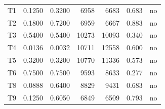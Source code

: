 \begin{table}[!htbp]
\begin{tabular}{lrrrrrl}
T1 & 0.1250 & 0.3200 & 6958 & 6683 & 0.683 & no \\
T2 & 0.1800 & 0.7200 & 6959 & 6667 & 0.883 & no \\
T3 & 0.5400 & 0.5400 & 10273 & 10093 & 0.340 & no \\
T4 & 0.0136 & 0.0032 & 10711 & 12558 & 0.600 & no \\
T5 & 0.3200 & 0.3200 & 10770 & 11336 & 0.573 & no \\
T6 & 0.7500 & 0.7500 & 9593 & 8633 & 0.277 & no \\
T8 & 0.0888 & 0.6400 & 8829 & 9431 & 0.683 & no \\
T9 & 0.1250 & 0.6050 & 6849 & 6509 & 0.793 & no \\
\bottomrule
\end{tabular}
\end{table}

